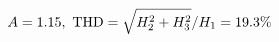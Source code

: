 \documentclass[preview]{standalone}
\begin{document}
\begin{align*}
\special{dvisvgm:raw <g id='unique000'>}A=1.15,\ \text{THD}=\sqrt{H_2^2+H_3^2}/H_1=19.3\%\special{dvisvgm:raw </g>}
\end{align*}
\end{document}

